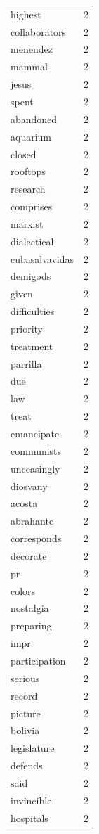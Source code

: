 \begin{tabular}{lr}
highest & 2 \\
collaborators & 2 \\
menendez & 2 \\
mammal & 2 \\
jesus & 2 \\
spent & 2 \\
abandoned & 2 \\
aquarium & 2 \\
closed & 2 \\
rooftops & 2 \\
research & 2 \\
comprises & 2 \\
marxist & 2 \\
dialectical & 2 \\
cubasalvavidas & 2 \\
demigods & 2 \\
given & 2 \\
difficulties & 2 \\
priority & 2 \\
treatment & 2 \\
parrilla & 2 \\
due & 2 \\
law & 2 \\
treat & 2 \\
emancipate & 2 \\
communists & 2 \\
unceasingly & 2 \\
diosvany & 2 \\
acosta & 2 \\
abrahante & 2 \\
corresponds & 2 \\
decorate & 2 \\
pr & 2 \\
colors & 2 \\
nostalgia & 2 \\
preparing & 2 \\
impr & 2 \\
participation & 2 \\
serious & 2 \\
record & 2 \\
picture & 2 \\
bolivia & 2 \\
legislature & 2 \\
defends & 2 \\
said & 2 \\
invincible & 2 \\
hospitals & 2 \\

\end{tabular}
